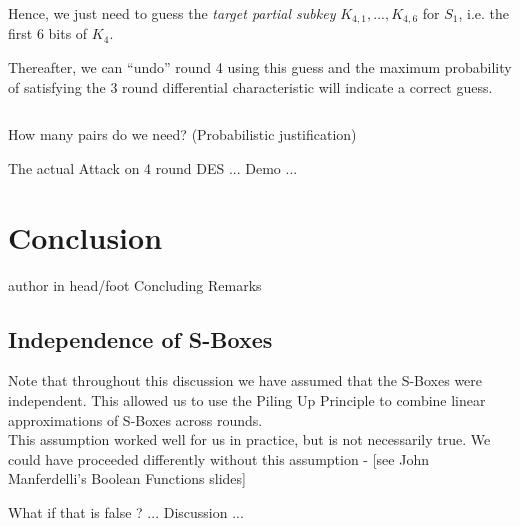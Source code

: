 \documentclass[9pt]{beamer}
\begin{document}
\begin{frame}
\begin{columns}
\begin{column}{0.6\textwidth}
\vspace{2mm}
\pause Hence, we just need to guess the {\it target partial subkey} $K_{4,1}, ..., K_{4,6}$ for $S_1$, i.e. the first 6 bits of $K_4$. 

\vspace{2mm}
\pause Thereafter, we can ``undo'' round 4 using this guess and  the maximum probability of satisfying the 3 round differential characteristic will indicate a correct guess.
\end{column}
\end{columns}
\end{frame}

\begin{frame}
How many pairs do we need? (Probabilistic justification)

\end{frame}

\begin{frame}
The actual Attack on 4 round DES ... Demo ...
\end{frame}


\section{Conclusion}
\begin{frame}
\begin{beamercolorbox}[ht=2.5ex,dp=1.125ex,center,rounded=true,shadow=true]{author in head/foot}
Concluding Remarks
\end{beamercolorbox}
\end{frame}

\subsection{Independence of S-Boxes}
\begin{frame}
Note that throughout this discussion we have assumed that the S-Boxes were independent. This allowed us to use the Piling Up Principle to combine linear approximations of S-Boxes across rounds. \\
\vspace{3mm}
This assumption worked well for us in practice, but is not necessarily true. We could have proceeded differently without this assumption - [see John Manferdelli's Boolean Functions slides]
\end{frame}

\begin{frame}
What if that is false ? ... Discussion ...

\end{frame}
\end{document}
